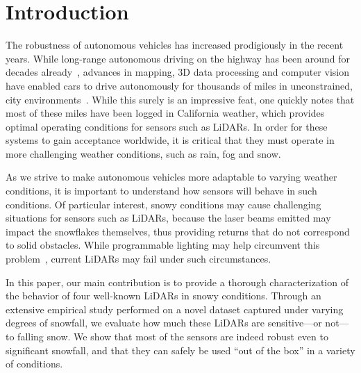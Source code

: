 \section{Introduction}

The robustness of autonomous vehicles has increased prodigiously in the recent years. While long-range autonomous driving on the highway has been around for decades already~\cite{Pomerleau_1996_616}, advances in mapping, 3D data processing and computer vision have enabled cars to drive autonomously for thousands of miles in unconstrained, city environments~\cite{urmson2008autonomous}. While this surely is an impressive feat, one quickly notes that most of these miles have been logged in California weather, which provides optimal operating conditions for sensors such as LiDARs. In order for these systems to gain acceptance worldwide, it is critical that they must operate in more challenging weather conditions, such as rain, fog and snow. 

As we strive to make autonomous vehicles more adaptable to varying weather conditions, it is important to understand how sensors will behave in such conditions. Of particular interest, snowy conditions may cause challenging situations for sensors such as LiDARs, because the laser beams emitted may impact the snowflakes themselves, thus providing returns that do not correspond to solid obstacles. While programmable lighting may help circumvent this problem~\cite{tamburo2014programmable}, current LiDARs may fail under such circumstances. 

In this paper, our main contribution is to provide a thorough characterization of the behavior of four well-known LiDARs in snowy conditions. Through an extensive empirical study performed on a novel dataset captured under varying degrees of snowfall, we evaluate how much these LiDARs are sensitive---or not---to falling snow. We show that most of the sensors are indeed robust even to significant snowfall, and that they can safely be used ``out of the box'' in a variety of conditions. 



